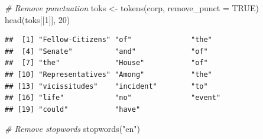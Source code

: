 \documentclass[
  12pt,
]{style/krantz}
\newenvironment{Shaded}{\begin{snugshade}}{\end{snugshade}}
\newcommand{\AttributeTok}[1]{\textcolor[rgb]{0.77,0.63,0.00}{#1}}
\newcommand{\CommentTok}[1]{\textcolor[rgb]{0.56,0.35,0.01}{\textit{#1}}}
\newcommand{\ConstantTok}[1]{\textcolor[rgb]{0.00,0.00,0.00}{#1}}
\newcommand{\DecValTok}[1]{\textcolor[rgb]{0.00,0.00,0.81}{#1}}
\newcommand{\FunctionTok}[1]{\textcolor[rgb]{0.00,0.00,0.00}{#1}}
\newcommand{\NormalTok}[1]{#1}
\newcommand{\OtherTok}[1]{\textcolor[rgb]{0.56,0.35,0.01}{#1}}
\newcommand{\StringTok}[1]{\textcolor[rgb]{0.31,0.60,0.02}{#1}}
\begin{document}
\begin{Shaded}
\begin{Highlighting}[]
\CommentTok{\# Remove punctuation}
\NormalTok{toks }\OtherTok{\textless{}{-}} \FunctionTok{tokens}\NormalTok{(corp, }\AttributeTok{remove\_punct =} \ConstantTok{TRUE}\NormalTok{)}
\FunctionTok{head}\NormalTok{(toks[[}\DecValTok{1}\NormalTok{]], }\DecValTok{20}\NormalTok{)}
\end{Highlighting}
\end{Shaded}

\begin{verbatim}
##  [1] "Fellow-Citizens" "of"              "the"            
##  [4] "Senate"          "and"             "of"             
##  [7] "the"             "House"           "of"             
## [10] "Representatives" "Among"           "the"            
## [13] "vicissitudes"    "incident"        "to"             
## [16] "life"            "no"              "event"          
## [19] "could"           "have"
\end{verbatim}

\begin{Shaded}
\begin{Highlighting}[]
\CommentTok{\# Remove stopwords}
\FunctionTok{stopwords}\NormalTok{(}\StringTok{"en"}\NormalTok{)}
\end{Highlighting}
\end{Shaded}
\end{document}
